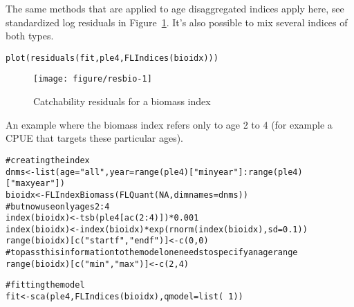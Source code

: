 \documentclass[a4paper,english,10pt]{article}\usepackage[]{graphicx}\usepackage[]{color}
\makeatletter
\def\maxwidth{ %
  \ifdim\Gin@nat@width>\linewidth
    \linewidth
  \else
    \Gin@nat@width
  \fi
}
\newcommand{\hlnum}[1]{\textcolor[rgb]{0.2,0.2,0.2}{#1}}%
\newcommand{\hlstr}[1]{\textcolor[rgb]{0.2,0.2,0.2}{#1}}%
\newcommand{\hlcom}[1]{\textcolor[rgb]{0.2,0.267,0.4}{#1}}%
\newcommand{\hlopt}[1]{\textcolor[rgb]{0.2,0.2,0.2}{#1}}%
\newcommand{\hlstd}[1]{\textcolor[rgb]{0,0,0}{#1}}%
\newcommand{\hlkwb}[1]{\textcolor[rgb]{0.361,0.506,0.596}{#1}}%
\newcommand{\hlkwc}[1]{\textcolor[rgb]{0.361,0.506,0.596}{#1}}%
\newcommand{\hlkwd}[1]{\textcolor[rgb]{0.361,0.506,0.596}{#1}}%
\newenvironment{kframe}{%
 \def\at@end@of@kframe{}%
 \ifinner\ifhmode%
  \def\at@end@of@kframe{\end{minipage}}%
  \begin{minipage}{\columnwidth}%
 \fi\fi%
 \def\FrameCommand##1{\hskip\@totalleftmargin \hskip-\fboxsep
 \colorbox{shadecolor}{##1}\hskip-\fboxsep
     \hskip-\linewidth \hskip-\@totalleftmargin \hskip\columnwidth}%
 \MakeFramed {\advance\hsize-\width
   \@totalleftmargin\z@ \linewidth\hsize
   \@setminipage}}%
 {\par\unskip\endMakeFramed%
 \at@end@of@kframe}
\newenvironment{knitrout}{}{} %
\makeatother
\begin{document}
The same methods that are applied to age disaggregated indices apply here, see standardized log residuals in Figure~\ref{fig:resbio}. It's also possible to mix several indices of both types.

\begin{knitrout}
\color{fgcolor}\begin{kframe}
\begin{alltt}
\hlkwd{plot}\hlstd{(}\hlkwd{residuals}\hlstd{(fit, ple4,} \hlkwd{FLIndices}\hlstd{(bioidx)))}
\end{alltt}
\end{kframe}\begin{figure}[H]

{\centering \texttt{[image: figure/resbio-1]} 

}

\caption[Catchability residuals for a biomass index]{Catchability residuals for a biomass index}\label{fig:resbio}
\end{figure}


\end{knitrout}

An example where the biomass index refers only to age 2 to 4 (for example a CPUE that targets these particular ages).

\begin{knitrout}
\color{fgcolor}\begin{kframe}
\begin{alltt}
\hlcom{# creating the index}
\hlstd{dnms} \hlkwb{<-} \hlkwd{list}\hlstd{(}\hlkwc{age}\hlstd{=}\hlstr{"all"}\hlstd{,} \hlkwc{year}\hlstd{=}\hlkwd{range}\hlstd{(ple4)[}\hlstr{"minyear"}\hlstd{]}\hlopt{:}\hlkwd{range}\hlstd{(ple4)[}\hlstr{"maxyear"}\hlstd{])}
\hlstd{bioidx} \hlkwb{<-} \hlkwd{FLIndexBiomass}\hlstd{(}\hlkwd{FLQuant}\hlstd{(}\hlnum{NA}\hlstd{,} \hlkwc{dimnames}\hlstd{=dnms))}
\hlcom{# but now use only ages 2:4}
\hlkwd{index}\hlstd{(bioidx)} \hlkwb{<-} \hlkwd{tsb}\hlstd{(ple4[}\hlkwd{ac}\hlstd{(}\hlnum{2}\hlopt{:}\hlnum{4}\hlstd{)])}\hlopt{*}\hlnum{0.001}
\hlkwd{index}\hlstd{(bioidx)} \hlkwb{<-} \hlkwd{index}\hlstd{(bioidx)}\hlopt{*}\hlkwd{exp}\hlstd{(}\hlkwd{rnorm}\hlstd{(}\hlkwd{index}\hlstd{(bioidx),} \hlkwc{sd}\hlstd{=}\hlnum{0.1}\hlstd{))}
\hlkwd{range}\hlstd{(bioidx)[}\hlkwd{c}\hlstd{(}\hlstr{"startf"}\hlstd{,}\hlstr{"endf"}\hlstd{)]} \hlkwb{<-} \hlkwd{c}\hlstd{(}\hlnum{0}\hlstd{,}\hlnum{0}\hlstd{)}
\hlcom{# to pass this information to the model one needs to specify an age range}
\hlkwd{range}\hlstd{(bioidx)[}\hlkwd{c}\hlstd{(}\hlstr{"min"}\hlstd{,}\hlstr{"max"}\hlstd{)]} \hlkwb{<-} \hlkwd{c}\hlstd{(}\hlnum{2}\hlstd{,}\hlnum{4}\hlstd{)}

\hlcom{# fitting the model}
\hlstd{fit} \hlkwb{<-} \hlkwd{sca}\hlstd{(ple4,} \hlkwd{FLIndices}\hlstd{(bioidx),} \hlkwc{qmodel}\hlstd{=}\hlkwd{list}\hlstd{(}\hlopt{~}\hlnum{1}\hlstd{))}
\end{alltt}
\end{kframe}
\end{knitrout}
\end{document}

